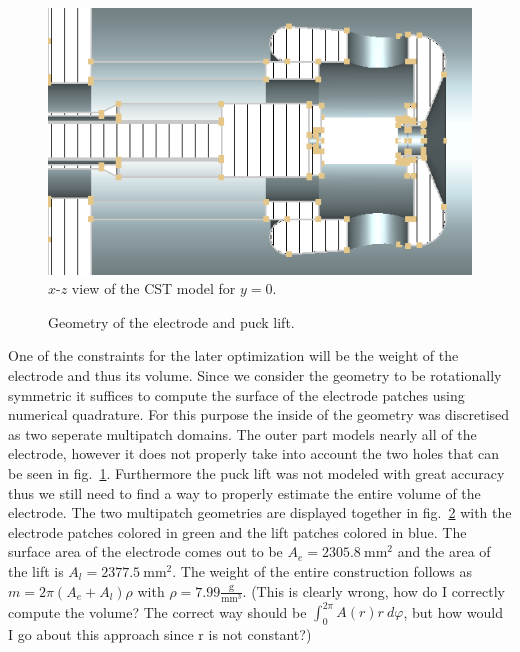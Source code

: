 \begin{center}
\begin{figure}[H]
  \includegraphics[width=\textwidth]{figures/200kV/v1_cuty}
  \caption{$x$-$z$ view of the CST model for $y=0$.}
  \label{fig:cst_geometry_xz}
\end{figure}
\end{center}

\begin{center}
\begin{figure}[H]
  
  \caption{Geometry of the electrode and puck lift.}
  \label{fig:geometry_electrode}
\end{figure}
\end{center}

One of the constraints for the later optimization will be the weight of the electrode and thus its volume. Since we consider the geometry to be rotationally symmetric it suffices to compute the surface of the electrode patches using numerical quadrature. For this purpose the inside of the geometry was discretised as two seperate multipatch domains. The outer part models nearly all of the electrode, however it does not properly take into account the two holes that can be seen in fig.~\ref{fig:cst_geometry_xz}. Furthermore the puck lift was not modeled with great accuracy thus we still need to find a way to properly estimate the entire volume of the electrode.
The two multipatch geometries are displayed together in fig.~\ref{fig:geometry_electrode} with the electrode patches colored in green and the lift patches colored in blue.
The surface area of the electrode comes out to be $A_e = 2305.8\ \mathrm{mm}^2$ and the area of the lift is $A_l = 2377.5\ \mathrm{mm}^2$. The weight of the entire construction follows as $m = 2\pi(A_e+A_l)\rho$ with $\rho = 7.99 \frac{\mathrm{g}}{\mathrm{mm}^3}$. (This is clearly wrong, how do I correctly compute the volume? The correct way should be $\int_0^{2\pi} A(r)r\ d\varphi$, but how would I go about this approach since r is not constant?)

